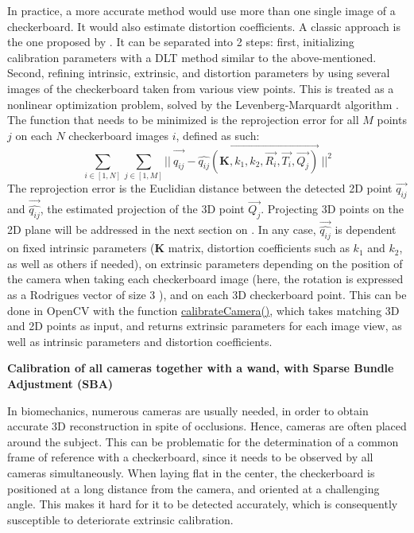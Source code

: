 In practice, a more accurate method would use more than one single image of a checkerboard. It would also estimate distortion coefficients. A classic approach is the one proposed by \cite{Zhang2000}. It can be separated into 2 steps: first, initializing calibration parameters with a DLT method similar to the above-mentioned. Second, refining intrinsic, extrinsic, and distortion parameters by using several images of the checkerboard taken from various view points. This is treated as a nonlinear optimization problem, solved by the Levenberg-Marquardt algorithm \cite{More1978}. The function that needs to be minimized is the reprojection error for all $M$ points $j$ on each $N$ checkerboard images $i$, defined as such:
\begin{equation}\label{eq:LM_algo}
  \sum_{i \in [1,N]} \sum_{j \in [1,M]} 
  ||\ \overrightarrow{q_{ij}^{\ ^{\ ^{\ ^{\ }}}}} -
  \overrightarrow{\widehat{q_{ij}}(\textbf{K},k_1,k_2,\overrightarrow{R_i},\overrightarrow{T_i},\overrightarrow{Q_j})}\ 
  ||^2
\end{equation} 
The reprojection error is the Euclidian distance between the detected 2D point $\overrightarrow{q_{ij}}$ and $\overrightarrow{\widehat{q_{ij}}}$, the estimated projection of the 3D point $\overrightarrow{Q_j}$. Projecting 3D points on the 2D plane will be addressed in the next section on . In any case, $\overrightarrow{\widehat{q_{ij}}}$ is dependent on fixed intrinsic parameters (\textbf{K} matrix, distortion coefficients such as $k_1$ and $k_2$, as well as others if needed), on extrinsic parameters depending on the position of the camera when taking each checkerboard image (here, the rotation is expressed as a Rodrigues vector of size 3 \cite{Gallego2015}), and on each 3D checkerboard point. This can be done in OpenCV with the function \href{https://docs.opencv.org/4.x/d9/d0c/group__calib3d.html#ga3207604e4b1a1758aa66acb6ed5aa65d}{calibrateCamera()}, which takes matching 3D and 2D points as input, and returns extrinsic parameters for each image view, as well as intrinsic parameters and distortion coefficients.

\vspace*{0.5cm}
\noindent\textbf{Calibration of all cameras together with a wand, with Sparse Bundle Adjustment (SBA)} 

In biomechanics, numerous cameras are usually needed, in order to obtain accurate 3D reconstruction in spite of occlusions. Hence, cameras are often placed around the subject. This can be problematic for the determination of a common frame of reference with a checkerboard, since it needs to be observed by all cameras simultaneously. When laying flat in the center, the checkerboard is positioned at a long distance from the camera, and oriented at a challenging angle. This makes it hard for it to be detected accurately, which is consequently susceptible to deteriorate extrinsic calibration. 

